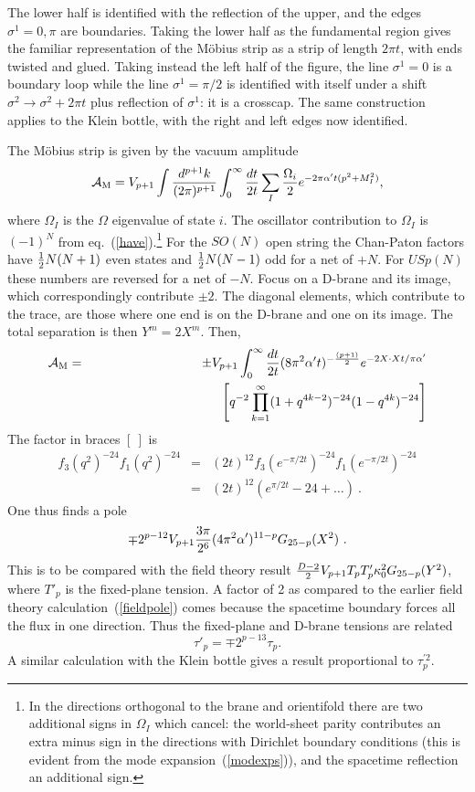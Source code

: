 \documentclass[12pt]{article}
\def\be{\begin{equation}}
\def\ee{\end{equation}}
\def\bea{\begin{eqnarray}}
\def\eea{\end{eqnarray}}
\def\ap{\alpha'}
\begin{document}
The lower half is identified with the reflection of the upper, and the
edges $\sigma^1 = 0, \pi$ are boundaries.  Taking the lower half as the
fundamental region gives the familiar representation of the M\"obius
strip as a strip of length $2\pi t$, with ends twisted and glued. 
Taking instead the left half of the figure, the line $\sigma^1 = 0$ is a
boundary loop while the line $\sigma^1 = \pi/2$ is identified with
itself under a shift
$\sigma^2 \to \sigma^2 + 2\pi t$ plus reflection of $\sigma^1$: it is a
crosscap.  The same construction applies to the Klein bottle, with the 
right and left edges now identified.

The M\"obius strip is given by the vacuum amplitude
\be
{\cal A}_{\rm M} = V_{p+1}\int \frac{d^{p+1}k}{(2\pi)^{p+1}} \int_0^\infty
{dt \over 2t} \sum_{I} {\Omega_i\over 2} e^{-2\pi \ap t (p^2 + M_I^2)} ,
\ee
where $\Omega_I$ is the $\Omega$ eigenvalue of state $i$.  The oscillator
contribution to $\Omega_I$ is $(-1)^N$ from eq.~(\ref{have}).\footnote
{In the directions orthogonal to the brane and orientifold there are two
additional signs in $\Omega_I$ which cancel: the world-sheet parity
contributes an extra minus sign in the directions with Dirichlet boundary
conditions (this is evident from the mode expansion~(\ref{modexps})), and the
spacetime reflection an additional sign.}  For
the $SO(N)$ open string the Chan-Paton factors have ${1\over 2}N(N+1)$ even
states and ${1\over 2}N(N-1)$ odd for a net of $+N$. For $USp(N)$ these
numbers are reversed for a net of $-N$.  Focus on a D-brane and its
image, which correspondingly contribute $\pm 2$.  The diagonal elements,
which contribute to the trace, are those where one end is on the D-brane
and one on its image.  The total separation is then $Y^m = 2X^m$.  Then,
\bea
{\cal A}_{\rm M} &=& \pm V_{p+1} \int_0^\infty {dt\over 2t} (8\pi^2 \ap
t)^{-{(p+1)\over2}} e^{-2X \cdot X t/ \pi\ap} \nonumber\\
&&\qquad\qquad\qquad\qquad\qquad
\left[ q^{-2} \prod_{k=1}^\infty (1+q^{4k-2})^{-24} (1-q^{4k})^{-24} \right]
\eea
The factor in braces $[\ ]$ is
\bea
f_3(q^2)^{-24} f_1(q^2)^{-24} &=& (2t)^{12} 
f_3(e^{-\pi/2t})^{-24} f_1(e^{-\pi/2t})^{-24} \nonumber\\
&=& (2t)^{12} \left(e^{\pi/2t} - 24 + \ldots \right)\ .
\eea
One thus finds a pole
\be
\mp 2^{p - 12} V_{p+1} {3 \pi\over 2^{6}}  (4\pi^2\ap)^{11-p}
G_{25-p}(X^2)\ .  \label{orten}
\ee
This is to be compared with the field theory result ${D-2\over2} V_{p+1}
T_p T'_p  \kappa_0^2 G_{25-p}(Y^2)$, where
$T'_p$ is the fixed-plane tension.  A factor of 2 as compared to the
earlier field theory calculation~(\ref{fieldpole}) comes because the
spacetime boundary forces all the flux in one direction.  Thus the fixed-plane
and D-brane tensions are related 
\be
\tau'_p = \mp 2^{p - 13} \tau_p.
\ee
A similar calculation with the Klein bottle gives a result proportional
to $\tau_p^{\prime 2}$.
\end{document}
